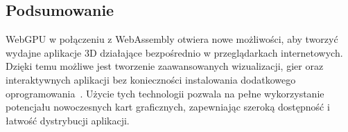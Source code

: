 \subsection{Podsumowanie}
WebGPU w połączeniu z WebAssembly otwiera nowe możliwości, aby tworzyć wydajne aplikacje 3D działające bezpośrednio w przeglądarkach internetowych. Dzięki temu możliwe jest tworzenie zaawansowanych wizualizacji, gier oraz interaktywnych aplikacji bez konieczności instalowania dodatkowego oprogramowania~\cite{11058514}. Użycie tych technologii pozwala na pełne wykorzystanie potencjału nowoczesnych kart graficznych, zapewniając szeroką dostępność i łatwość dystrybucji aplikacji.